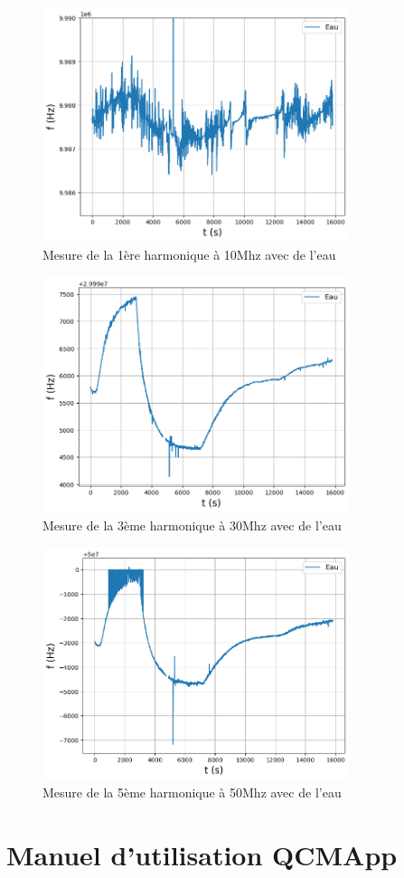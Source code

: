 \begin{figure}[H]
    \centering
    \includegraphics[width=0.8\textwidth]{assets/figures/annex10MHzFrequ.png}
    \caption{Mesure de la 1ère harmonique à 10Mhz avec de l'eau}
    \label{fig:choix_harmonique10MHz}
\end{figure}

\begin{figure}[H]
    \centering
    \includegraphics[width=0.8\textwidth]{assets/figures/annex30MHzFrequ.png}
    \caption{Mesure de la 3ème harmonique à 30Mhz avec de l'eau}
    \label{fig:choix_harmonique30MHz}
\end{figure}

\begin{figure}[H]
    \centering
    \includegraphics[width=0.8\textwidth]{assets/figures/annex50MHzFrequ.png}
    \caption{Mesure de la 5ème harmonique à 50Mhz avec de l'eau}
    \label{fig:choix_harmonique50MHz}
\end{figure}
\chapter{Manuel d'utilisation QCMApp}
